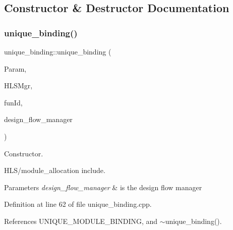 \subsection{Constructor \& Destructor Documentation}
\mbox{\label{classunique__binding_ad92c3d681deec507f2a2da257b39a496}} 
\subsubsection{\texorpdfstring{unique\+\_\+binding()}{unique\_binding()}}
{\footnotesize\ttfamily unique\+\_\+binding\+::unique\+\_\+binding (\begin{DoxyParamCaption}\item[{const \hyperlink{Parameter_8hpp_a37841774a6fcb479b597fdf8955eb4ea}{Parameter\+Const\+Ref}}]{Param,  }\item[{const \hyperlink{hls__manager_8hpp_acd3842b8589fe52c08fc0b2fcc813bfe}{H\+L\+S\+\_\+manager\+Ref}}]{H\+L\+S\+Mgr,  }\item[{unsigned int}]{fun\+Id,  }\item[{const Design\+Flow\+Manager\+Const\+Ref}]{design\+\_\+flow\+\_\+manager }\end{DoxyParamCaption})}



Constructor. 

H\+L\+S/module\+\_\+allocation include.


\begin{DoxyParams}{Parameters}
{\em design\+\_\+flow\+\_\+manager} & is the design flow manager \\
\hline
\end{DoxyParams}


Definition at line 62 of file unique\+\_\+binding.\+cpp.



References U\+N\+I\+Q\+U\+E\+\_\+\+M\+O\+D\+U\+L\+E\+\_\+\+B\+I\+N\+D\+I\+NG, and $\sim$unique\+\_\+binding().

